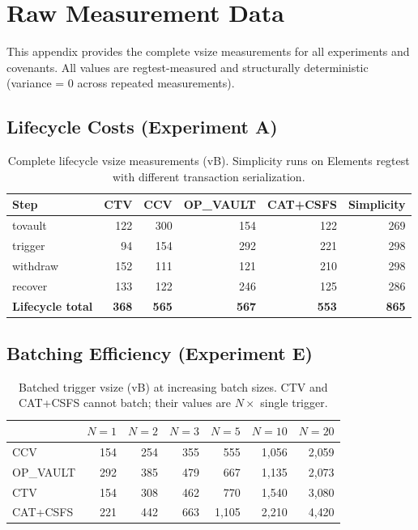 \chapter{Raw Measurement Data} \label{app:data}

This appendix provides the complete vsize measurements for all experiments and
covenants. All values are regtest-measured and structurally deterministic
(variance = 0 across repeated measurements).

\section{Lifecycle Costs (Experiment A)}

\begin{table}[h]
\centering
\caption{Complete lifecycle vsize measurements (vB). Simplicity runs on Elements
regtest with different transaction serialization.}
\label{tab:app_lifecycle}
\begin{tabular}{@{}lrrrrr@{}}
\toprule
Step & CTV & CCV & OP\_VAULT & CAT+CSFS & Simplicity \\
\midrule
tovault   & 122 & 300 & 154 & 122 & 269 \\
trigger   &  94 & 154 & 292 & 221 & 298 \\
withdraw  & 152 & 111 & 121 & 210 & 298 \\
recover   & 133 & 122 & 246 & 125 & 286 \\
\midrule
\textbf{Lifecycle total} & \textbf{368} & \textbf{565} & \textbf{567} & \textbf{553} & \textbf{865} \\
\bottomrule
\end{tabular}
\end{table}

\section{Batching Efficiency (Experiment E)}

\begin{table}[h]
\centering
\caption{Batched trigger vsize (vB) at increasing batch sizes. CTV and CAT+CSFS
cannot batch; their values are $N \times$ single trigger.}
\label{tab:app_batching}
\begin{tabular}{@{}lrrrrrr@{}}
\toprule
& $N{=}1$ & $N{=}2$ & $N{=}3$ & $N{=}5$ & $N{=}10$ & $N{=}20$ \\
\midrule
CCV           & 154   & 254   & 355   & 555     & 1{,}056  & 2{,}059 \\
OP\_VAULT     & 292   & 385   & 479   & 667     & 1{,}135  & 2{,}073 \\
CTV           & 154   & 308   & 462   & 770     & 1{,}540  & 3{,}080 \\
CAT+CSFS      & 221   & 442   & 663   & 1{,}105 & 2{,}210  & 4{,}420 \\
\bottomrule
\end{tabular}
\end{table}

